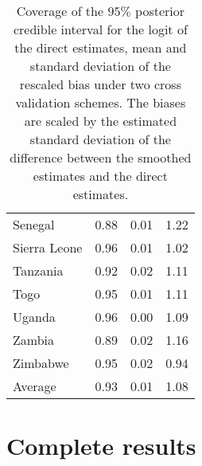 \documentclass[12pt]{article}\usepackage[]{graphicx}\usepackage[]{color}
\begin{document}
\begin{table}[ht]
\begin{tabular}{lrrr}
  Senegal & 0.88 & 0.01 & 1.22 \\ 
  Sierra Leone & 0.96 & 0.01 & 1.02 \\ 
  Tanzania & 0.92 & 0.02 & 1.11 \\ 
  Togo & 0.95 & 0.01 & 1.11 \\ 
  Uganda & 0.96 & 0.00 & 1.09 \\ 
  Zambia & 0.89 & 0.02 & 1.16 \\ 
  Zimbabwe & 0.95 & 0.02 & 0.94 \\ 
  \hline
  Average & 0.93 & 0.01 & 1.08 \\ 
   \bottomrule
\end{tabular}
\caption{Coverage of the $95\%$ posterior credible interval for the logit of the direct estimates, mean and standard deviation of the rescaled bias under two cross validation schemes. The biases are scaled by the estimated standard deviation of the difference between the smoothed estimates and the direct estimates.}
\label{tab:cv}
\end{table}

 





\clearpage
\section{Complete results}
\end{document}
